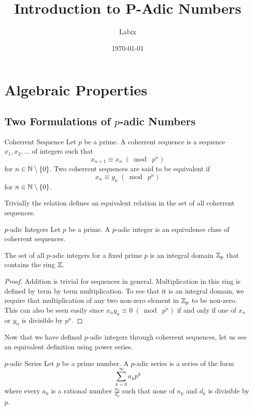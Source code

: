\documentclass[a4paper]{article}
\title{Introduction to P-Adic Numbers}
\author{Labix}
\date{\today}
\begin{document}
\maketitle
\begin{abstract}
\end{abstract}
\tableofcontents
\pagebreak

\section{Algebraic Properties}
\subsection{Two Formulations of $p$-adic Numbers}
\begin{defn}{Coherrent Sequence}{} Let $p$ be a prime. A coherrent sequence is a sequence $x_1,x_2,\dots$ of integers such that $$x_{n+1}\equiv x_n\;(\bmod\; p^n)$$ for $n\in\mathbb{N}\setminus\{0\}$. Two coherrent sequences are said to be equivalent if $$x_n\equiv y_n\;(\bmod\; p^n)$$ for $n\in\mathbb{N}\setminus\{0\}$. 
\end{defn}

Trivially the relation defines an equivalent relation in the set of all coherrent sequences. 

\begin{defn}{$p$-adic Integers}{} Let $p$ be a prime. A $p$-adic integer is an equivalence class of coherrent sequences. 
\end{defn}

\begin{prp}{}{} The set of all $p$-adic integers for a fixed prime $p$ is an integral domain $\mathbb{Z}_p$ that contains the ring $\mathbb{Z}$. \tcbline
\begin{proof}
Addition is trivial for sequences in general. Multiplication in this ring is defined by term by term multiplication. To see that it is an integral domain, we require that multiplication of any two non-zero element in $\mathbb{Z}_p$ to be non-zero. This can also be seen easily since $x_ny_n\equiv0\;(\bmod\; p^n)$ if and only if one of $x_n$ or $y_n$ is divisible by $p^n$. 
\end{proof}
\end{prp}

Now that we have defined $p$-adic integers through coherrent sequences, let us see an equivalent definition using power series. 

\begin{defn}{$p$-adic Series}{} Let $p$ be a prime number. A $p$-adic series is a series of the form $$\sum_{k=0}^\infty a_kp^k$$ where every $a_k$ is a rational number $\frac{n_k}{d_k}$ such that none of $n_k$ and $d_k$ is divisible by $p$. 
\end{defn}
\end{document}
